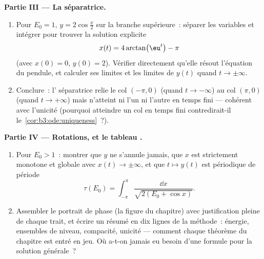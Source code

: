 \begin{problem}
\medskip
\noindent\textbf{Partie III --- La séparatrice.}
\begin{enumerate}[resume]
  \item Pour $E_0 = 1$, $y = 2\cos\frac x2$ sur la branche
        supérieure~: séparer les variables et intégrer pour
        trouver la solution explicite
        \[
        x(t) = 4\arctan\bigl(\eu^{t}\bigr) - \pi
        \]
        (avec $x(0) = 0$, $y(0) = 2$). Vérifier directement
        qu'elle résout l'équation du pendule, et calculer ses
        limites et les limites de $y(t)$ quand $t \to
        \pm\infty$.
  \item Conclure~: l' séparatrice relie le col
        $(-\pi, 0)$ (quand $t \to -\infty$) au col $(\pi,
        0)$ (quand $t \to +\infty$) mais n'atteint ni l'un
        ni l'autre en temps fini --- cohérent avec l'unicité
        (pourquoi atteindre un col en temps fini
        contredirait-il le~\cref{cor:b3:ode:uniqueness}~?).
\end{enumerate}

\medskip
\noindent\textbf{Partie IV --- Rotations, et le tableau
.}
\begin{enumerate}[resume]
  \item Pour $E_0 > 1$~: montrer que $y$ ne s'annule jamais,
        que $x$ est strictement monotone et globale avec
        $x(t) \to \pm\infty$, et que $t \mapsto y(t)$ est
        périodique de période
        \[
        \tau(E_0) = \int_{-\pi}^{\pi}
        \frac{\dd x}{\sqrt{2(E_0 + \cos x)}} .
        \]
  \item Assembler le portrait de phase  (la figure du
        chapitre) avec justification pleine de chaque
        trait, et écrire un résumé en dix lignes de la
        méthode~: énergie, ensembles de niveau, compacité,
        unicité --- comment chaque théorème du chapitre est
        entré en jeu. Où a-t-on jamais eu besoin d'une
        formule pour la solution générale~?
\end{enumerate}


\end{problem}
